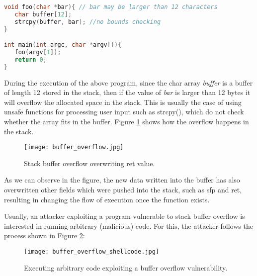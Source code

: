 \begin{lstlisting}[language=C, caption={Program vulnerable to buffer overflow.}, label={code:vuln_overflow}]
void foo(char *bar){ // bar may be larger than 12 characters
   char buffer[12];
   strcpy(buffer, bar); //no bounds checking 
}

int main(int argc, char *argv[]){
   foo(argv[1]);
   return 0;
}
\end{lstlisting}

During the execution of the above program, since the char array \textit{buffer} is a buffer of length 12 stored in the stack, then if the value of \textit{bar} is larger than 12 bytes it will overflow the allocated space in the stack. This is usually the case of using unsafe functions for processing user input such as strcpy(), which do not check whether the array fits in the buffer. Figure \ref{fig:buffer_overflow} shows how the overflow happens in the stack.

\begin{figure}[htbp]
	\centering
	\texttt{[image: buffer\_overflow.jpg]}
	\caption{Stack buffer overflow overwriting ret value.}
	\label{fig:buffer_overflow}
\end{figure}

As we can observe in the figure, the new data written into the buffer has also overwritten other fields which were pushed into the stack, such as sfp and ret, resulting in changing the flow of execution once the function exists.

Usually, an attacker exploiting a program vulnerable to stack buffer overflow is interested in running arbitrary (malicious) code. For this, the attacker follows the process shown in Figure \ref{fig:buffer_overflow_shellcode}:

\begin{figure}[htbp]
	\centering
	\texttt{[image: buffer\_overflow\_shellcode.jpg]}
	\caption{Executing arbitrary code exploiting a buffer overflow vulnerability.}
	\label{fig:buffer_overflow_shellcode}
\end{figure}

